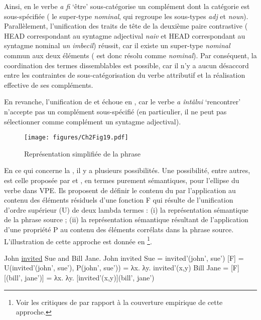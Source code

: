 Ainsi, en  le verbe \textit{a fi} ‘être’ sous-catégorise un complément dont la catégorie est sous-spécifiée ({\cad} le super-type \textit{nominal}, qui regroupe les sous-types \textit{adj} et \textit{noun}). Parallèlement, l’unification des traits de tête de la deuxième paire contrastive ({\cad} HEAD  correspondant au syntagme adjectival \textit{naiv} et HEAD  correspondant au syntagme nominal \textit{un imbecil}) réussit, car il existe un super-type \textit{nominal} commun aux deux éléments ( est donc résolu comme \textit{nominal}). Par conséquent, la coordination des termes dissemblables est possible, car il n’y a aucun désaccord entre les contraintes de sous-catégorisation du verbe attributif et la réalisation effective de ses compléments.

En revanche, l’unification de  et  échoue en , car le verbe \textit{a întâlni} ‘rencontrer’ n’accepte pas un complément sous-spécifié (en particulier, il ne peut pas sélectionner comme complément un syntagme adjectival).

\begin{figure} 

\texttt{[image: figures/Ch2Fig19.pdf]}%

\caption{Représentation simplifiée de la phrase }
\label{ch2:fig19}
\end{figure}

En ce qui concerne la , il y a plusieurs possibilités. Une possibilité, entre autres, est celle proposée par \citet{DalrympleEtAl1991} et \citet{Dalrymple2005}, en termes purement sémantiques, pour l’ellipse du verbe dans VPE. Ils proposent de définir le contenu du  par l’application au contenu des éléments résiduels d’une fonction F qui résulte de l’unification d’ordre supérieur (U) de deux lambda termes : (i) la représentation sémantique de la phrase source ; (ii) la représentation sémantique résultant de l’application d’une propriété P au contenu des éléments corrélats dans la phrase source. L’illustration de cette approche est donnée en \footnote{
 Voir les critiques de \citet{Ginzburg2012} par rapport à la couverture empirique de cette approche.}. 

\ea \label{ch2:ex274}
\ea John \uline{invited} Sue and Bill Jane.
\ex John invited Sue = invited’(john’, sue’)
\ex {} [F] = U(invited’(john’, sue’), P(john’, sue’)) = λx. λy. invited’(x,y)
\ex Bill Jane = [F][(bill’, jane’)] = λx. λy. [invited’(x,y)](bill’, jane’) 

